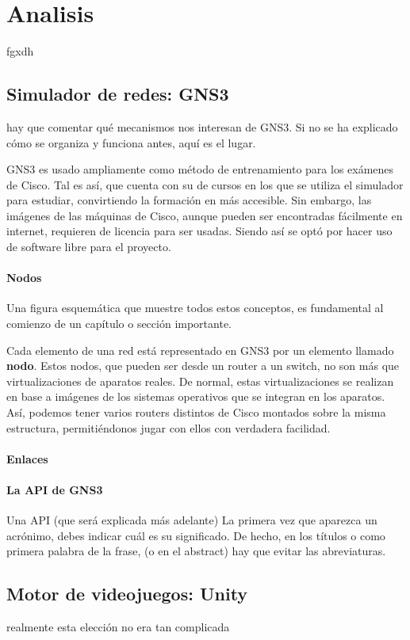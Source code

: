 \chapter{Analisis}\label{chap:Analisis}

fgxdh

\section{Simulador de redes: GNS3}
hay que comentar qué mecanismos nos interesan de GNS3. Si no se ha explicado cómo se organiza y funciona antes, aquí es el lugar.

GNS3 es usado ampliamente como método de entrenamiento para los exámenes de Cisco. Tal es así, que cuenta con su  de cursos en los que se utiliza el simulador para estudiar, convirtiendo la formación en más accesible. Sin embargo, las imágenes de las máquinas de Cisco, aunque pueden ser encontradas fácilmente en internet, requieren de licencia para ser usadas. Siendo así se optó por hacer uso de software libre para el proyecto. 

\subsubsection{Nodos}
Una figura esquemática que muestre todos estos conceptos, es fundamental al comienzo de un capítulo o sección importante.

Cada elemento de una red está representado en GNS3 por un elemento llamado \textbf{nodo}. Estos nodos, que pueden ser desde un router a un switch, no son más que virtualizaciones de aparatos reales. De normal, estas virtualizaciones se realizan en base a imágenes de los sistemas operativos que se integran en los aparatos. Así, podemos tener varios routers distintos de Cisco montados sobre la misma estructura, permitiéndonos jugar con ellos con verdadera facilidad.

\subsubsection{Enlaces}

\subsubsection{La API de GNS3}
Una API (que será explicada más adelante)
La primera vez que aparezca un acrónimo, debes indicar cuál es su significado. De hecho, en los títulos o como primera palabra de la frase, (o en el abstract) hay que evitar las abreviaturas.


\section{Motor de videojuegos: Unity}
realmente esta elección no era tan complicada